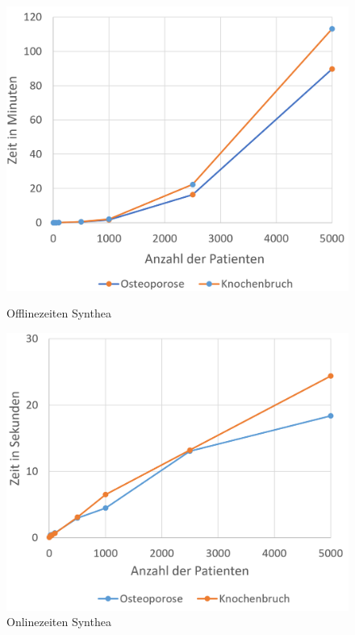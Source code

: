 \documentclass[german,version-2020-11]{uzl-thesis}
\begin{document}
	\begin{figure}[ht]
		\begin{minipage}{.5\textwidth}
		\centering
		\includegraphics[width=0.9\linewidth]{assets/OfflinezeitSynthea.png}
		\caption{Offlinezeiten Synthea}
		\label{fig:syntheaoffline}
	\end{minipage}
	\begin{minipage}{.5\textwidth}
		\centering
		\includegraphics[width=0.9\linewidth]{assets/onlineSynthea.png}
		\caption{Onlinezeiten Synthea}
		\label{fig:syntheaonline}
	\end{minipage}
\end{figure}
\noindent
\end{document}
